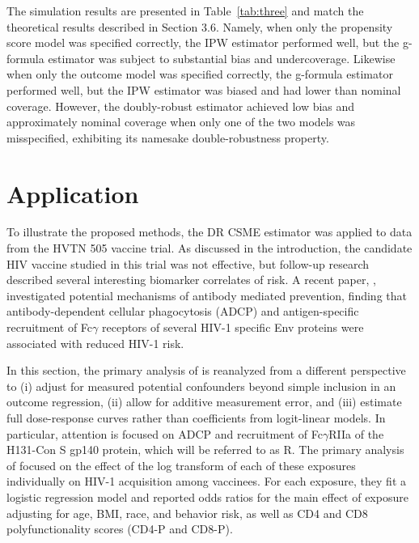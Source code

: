 \documentclass[useAMS,usenatbib,referee]{biom}
\newcommand{\RNum}[1]{\uppercase\expandafter{\romannumeral #1\relax}}
\begin{document}
The simulation results are presented in Table~\ref{tab:three} and match the theoretical results described in Section 3.6. Namely, when only the propensity score model was specified correctly, the IPW estimator performed well, but the g-formula estimator was subject to substantial bias and undercoverage. Likewise when only the outcome model was specified correctly, the g-formula estimator performed well, but the IPW estimator was biased and had lower than nominal coverage. However, the doubly-robust estimator achieved low bias and approximately nominal coverage when only one of the two models was misspecified, exhibiting its namesake double-robustness property.

\section{Application}

To illustrate the proposed methods, the DR CSME estimator was applied to data from the HVTN 505 vaccine trial. As discussed in the introduction, the candidate HIV vaccine studied in this trial was not effective, but follow-up research described several interesting biomarker correlates of risk. A recent paper, \citet{neidich2019}, investigated potential mechanisms of antibody mediated prevention, finding that antibody-dependent cellular phagocytosis (ADCP) and antigen-specific recruitment of Fc$\gamma$ receptors of several HIV-1 specific Env proteins were associated with reduced HIV-1 risk.

In this section, the primary analysis of \citet{neidich2019} is reanalyzed from a different perspective to (i) adjust for measured potential confounders beyond simple inclusion in an outcome regression, (ii) allow for additive measurement error, and (iii) estimate full dose-response curves rather than coefficients from logit-linear models. In particular, attention is focused on ADCP and recruitment of Fc$\gamma$RIIa of the H131-Con S gp140 protein, which will be referred to as R\RNum{2}. The primary analysis of \citet{neidich2019} focused on the effect of the log transform of each of these exposures individually on HIV-1 acquisition among vaccinees. For each exposure, they fit a logistic regression model and reported odds ratios for the main effect of exposure adjusting for age, BMI, race, and behavior risk, as well as CD4 and CD8 polyfunctionality scores (CD4-P and CD8-P).
\end{document}
